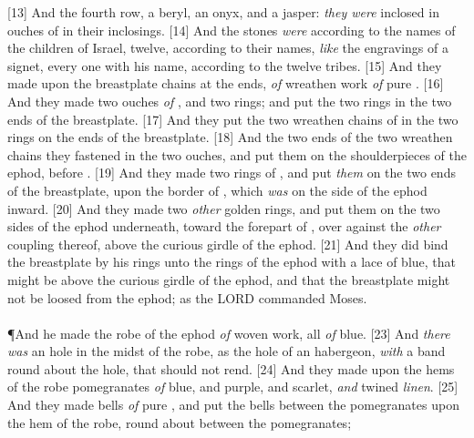 [13] \textcolor[cmyk]{0.99998,1,0,0}{And the fourth row, a beryl, an onyx, and a jasper: \emph{they were} inclosed in ouches of  in their inclosings.}
[14] \textcolor[cmyk]{0.99998,1,0,0}{And the stones \emph{were} according to the names of the children of Israel, twelve, according to their names, \emph{like} the engravings of a signet, every one with his name, according to the twelve tribes.}
[15] \textcolor[cmyk]{0.99998,1,0,0}{And they made upon the breastplate chains at the ends, \emph{of} wreathen work \emph{of} pure .}
[16] \textcolor[cmyk]{0.99998,1,0,0}{And they made two ouches \emph{of} , and two  rings; and put the two rings in the two ends of the breastplate.}
[17] \textcolor[cmyk]{0.99998,1,0,0}{And they put the two wreathen chains of  in the two rings on the ends of the breastplate.}
[18] \textcolor[cmyk]{0.99998,1,0,0}{And the two ends of the two wreathen chains they fastened in the two ouches, and put them on the shoulderpieces of the ephod, before .}
[19] \textcolor[cmyk]{0.99998,1,0,0}{And they made two rings of , and put \emph{them} on the two ends of the breastplate, upon the border of , which \emph{was} on the side of the ephod inward.}
[20] \textcolor[cmyk]{0.99998,1,0,0}{And they made two \emph{other} golden rings, and put them on the two sides of the ephod underneath, toward the forepart of , over against the \emph{other} coupling thereof, above the curious girdle of the ephod.}
[21] \textcolor[cmyk]{0.99998,1,0,0}{And they did bind the breastplate by his rings unto the rings of the ephod with a lace of blue, that  might be above the curious girdle of the ephod, and that the breastplate might not be loosed from the ephod; as the LORD commanded Moses.}\\
\\
\P \textcolor[cmyk]{0.99998,1,0,0}{And he made the robe of the ephod \emph{of} woven work, all \emph{of} blue.}
[23] \textcolor[cmyk]{0.99998,1,0,0}{And \emph{there was} an hole in the midst of the robe, as the hole of an habergeon, \emph{with} a band round about the hole, that  should not rend.}
[24] \textcolor[cmyk]{0.99998,1,0,0}{And they made upon the hems of the robe pomegranates \emph{of} blue, and purple, and scarlet, \emph{and} twined \emph{linen}.}
[25] \textcolor[cmyk]{0.99998,1,0,0}{And they made bells \emph{of} pure , and put the bells between the pomegranates upon the hem of the robe, round about between the pomegranates;}
